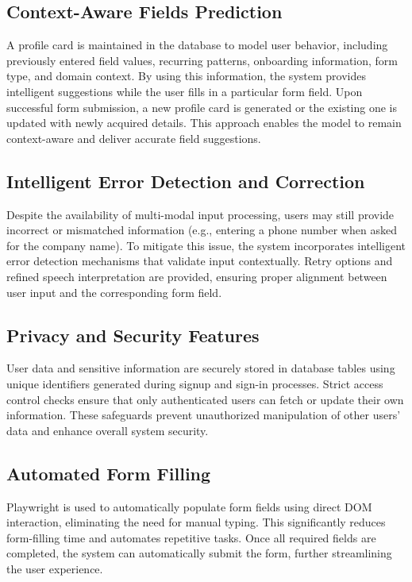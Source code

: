 \documentclass[conference]{IEEEtran}
\begin{document}
\subsection{Context-Aware Fields Prediction}
A profile card is maintained in the database to model user behavior, including previously entered field values, recurring patterns, onboarding information, form type, and domain context. By using this information, the system provides intelligent suggestions while the user fills in a particular form field. Upon successful form submission, a new profile card is generated or the existing one is updated with newly acquired details. This approach enables the model to remain context-aware and deliver accurate field suggestions.

\subsection{Intelligent Error Detection and Correction}
Despite the availability of multi-modal input processing, users may still provide incorrect or mismatched information (e.g., entering a phone number when asked for the company name). To mitigate this issue, the system incorporates intelligent error detection mechanisms that validate input contextually. Retry options and refined speech interpretation are provided, ensuring proper alignment between user input and the corresponding form field.

\subsection{Privacy and Security Features}
User data and sensitive information are securely stored in database tables using unique identifiers generated during signup and sign-in processes. Strict access control checks ensure that only authenticated users can fetch or update their own information. These safeguards prevent unauthorized manipulation of other users’ data and enhance overall system security.

\subsection{Automated Form Filling}
Playwright is used to automatically populate form fields using direct DOM interaction, eliminating the need for manual typing. This significantly reduces form-filling time and automates repetitive tasks. Once all required fields are completed, the system can automatically submit the form, further streamlining the user experience.
\end{document}
